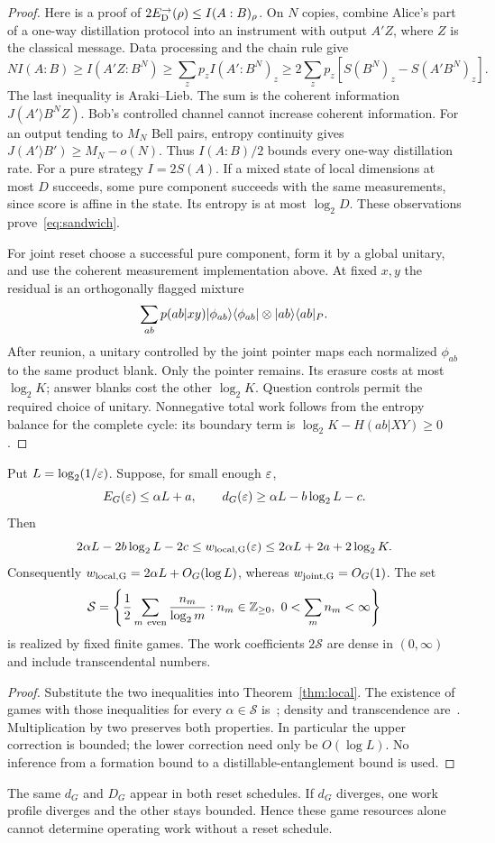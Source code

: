 \begin{proof}
Here is a proof of $2E_{\mathrm D}^{\to}(\rho)\le I(A:B)_\rho$. On $N$ copies, combine Alice's part of a one-way distillation protocol into an instrument with output $A'Z$, where $Z$ is the classical message. Data processing and the chain rule give
\[
 NI(A:B)\ge I(A'Z:B^N)\ge\sum_zp_z I(A':B^N)_z
 \ge2\sum_zp_z[S(B^N)_z-S(A'B^N)_z].
\]
The last inequality is Araki--Lieb. The sum is the coherent information $J(A'\rangle B^NZ)$. Bob's controlled channel cannot increase coherent information. For an output tending to $M_N$ Bell pairs, entropy continuity gives $J(A'\rangle B')\ge M_N-o(N)$. Thus $I(A:B)/2$ bounds every one-way distillation rate. For a pure strategy $I=2S(A)$. If a mixed state of local dimensions at most $D$ succeeds, some pure component succeeds with the same measurements, since score is affine in the state. Its entropy is at most $\log_2D$. These observations prove~\eqref{eq:sandwich}.

For joint reset choose a successful pure component, form it by a global unitary, and use the coherent measurement implementation above. At fixed $x,y$ the residual is an orthogonally flagged mixture
\[
 \sum_{ab}p(ab|xy)|\phi_{ab}\rangle\langle\phi_{ab}|\otimes|ab\rangle\langle ab|_P.
\]
After reunion, a unitary controlled by the joint pointer maps each normalized $\phi_{ab}$ to the same product blank. Only the pointer remains. Its erasure costs at most $\log_2K$; answer blanks cost the other $\log_2K$. Question controls permit the required choice of unitary. Nonnegative total work follows from the entropy balance for the complete cycle: its boundary term is $\log_2K-H(ab|XY)\ge0$.
\end{proof}

\begin{corollary}\label{cor:sharp}
Put $L=\log_2(1/\varepsilon)$. Suppose, for small enough $\varepsilon$,
\[
 E_G(\varepsilon)\le\alpha L+a,\qquad
 d_G(\varepsilon)\ge\alpha L-b\log_2L-c.
\]
Then
\begin{equation}
 2\alpha L-2b\log_2L-2c
 \le w_{\rm local,G}(\varepsilon)
 \le2\alpha L+2a+2\log_2K.\label{eq:sharp}
\end{equation}
Consequently $w_{\rm local,G}=2\alpha L+O_G(\log L)$, whereas $w_{\rm joint,G}=O_G(1)$.
The set
\[
 \mathcal S=\left\{\frac12\sum_{m\ {\rm even}}\frac{n_m}{\log_2m}:
 n_m\in\mathbb Z_{\ge0},\ 0<\sum_m n_m<\infty\right\}
\]
is realized by fixed finite games. The work coefficients $2\mathcal S$ are dense in $(0,\infty)$ and include transcendental numbers.
\end{corollary}
\begin{proof}
Substitute the two inequalities into Theorem~\ref{thm:local}. The existence of games with those inequalities for every $\alpha\in\mathcal S$ is~\cite[Theorem 11.9(a,b)]{precision}; density and transcendence are~\cite[Corollary 11.11]{precision}. Multiplication by two preserves both properties. In particular the upper correction is bounded; the lower correction need only be $O(\log L)$. No inference from a formation bound to a distillable-entanglement bound is used.
\end{proof}

The same $d_G$ and $D_G$ appear in both reset schedules. If $d_G$ diverges, one work profile diverges and the other stays bounded. Hence these game resources alone cannot determine operating work without a reset schedule.
